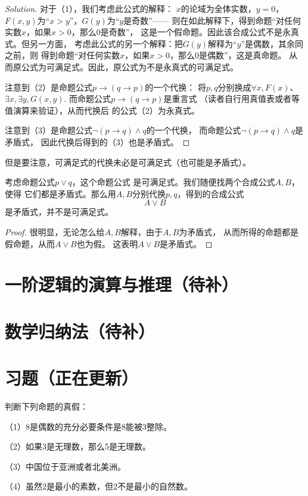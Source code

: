 \begin{proof}[Solution]
对于（1），我们考虑此公式的解释：
$x$的论域为全体实数，$y=0$，$F(x,y)$为“$x>y$”，$G(y)$为“$y$是奇数”——
则在如此解释下，得到命题“对任何实数$x$，如果$x>0$，那么$0$是奇数”，
这是一个假命题。因此该合成公式不是永真式。但另一方面，
考虑此公式的另一个解释：把$G(y)$解释为“$y$”是偶数，其余同之前，则
得到命题“对任何实数$x$，如果$x>0$，那么$0$是偶数”，这是真命题。
从而原公式为可满足式。因此，原公式为不是永真式的可满足式。\vs

注意到（2）是命题公式$p\rightarrow(q\rightarrow p)$的一个代换：
将$p,q$分别换成$\forall x,F(x)$、$\exists x,\exists y,G(x,y)$.
而命题公式$p\rightarrow(q\rightarrow p)$是重言式
（读者自行用真值表或者等值演算来验证），从而代换后
的公式（2）为永真式。\vs

注意到（3）是命题公式$\neg(p\rightarrow q)\wedge q$的一个代换，
而命题公式$\neg(p\rightarrow q)\wedge q$是矛盾式，
因此代换后得到的（3）也是矛盾式。
\end{proof}

但是要注意，可满足式的代换未必是可满足式（也可能是矛盾式）。

\begin{example}考虑命题公式$p\vee q$，这个命题公式
是可满足式。我们随便找两个合成公式$A,B$，使得
它们都是矛盾式。那么用$A,B$分别代换$p,q$，得到的合成公式
$$A\vee B$$
是矛盾式，并不是可满足式。
\end{example}

\begin{proof}
很明显，无论怎么给$A,B$解释，由于$A,B$为矛盾式，
从而所得的命题都是假命题，从而$A\vee B$也为假。
这表明$A\vee B$是矛盾式。
\end{proof}



\section{一阶逻辑的演算与推理（待补）}
\section{数学归纳法（待补）}
\section{习题（正在更新）}

\begin{prob}判断下列命题的真假：

（1）8是偶数的充分必要条件是8能被$3$整除。

（2）如果3是无理数，那么5是无理数。

（3）中国位于亚洲或者北美洲。

（4）虽然2是最小的素数，但2不是最小的自然数。

\end{prob}\vs

